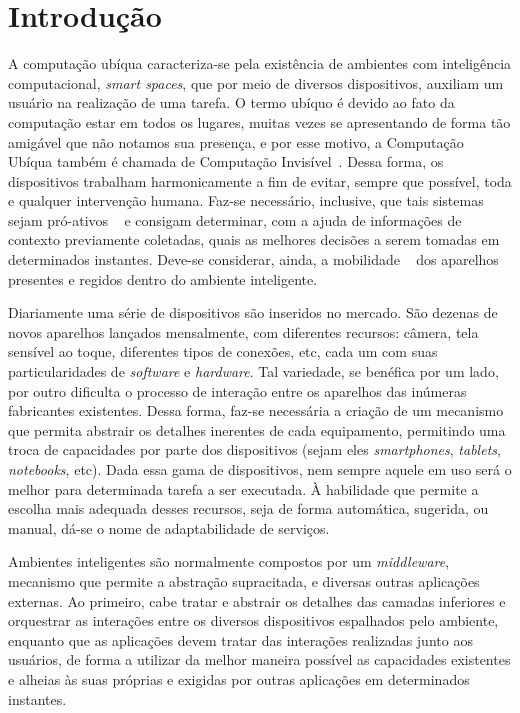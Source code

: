 \chapter{Introdução}

A computação ubíqua caracteriza-se pela existência de ambientes com inteligência computacional, \emph{smart spaces}, que por meio de diversos dispositivos, auxiliam um usuário na realização de uma tarefa. O termo ubíquo é devido ao fato da computação estar em todos os lugares, muitas vezes se apresentando de forma tão amigável que não notamos sua presença, e por esse motivo, a Computação Ubíqua também é chamada de Computação Invisível~\cite{gomes2007, weiser1993, weiser1999}. Dessa forma, os dispositivos trabalham harmonicamente a fim de evitar, sempre que possível, toda e qualquer intervenção humana. Faz-se necessário, inclusive, que tais sistemas sejam pró-ativos ~\cite{gomes2007, buzeto2010} e consigam determinar, com a ajuda de informações de contexto previamente coletadas, quais as melhores decisões a serem tomadas em determinados instantes. Deve-se considerar, ainda, a mobilidade ~\cite{gomes2007, buzeto2010, weiser1999} dos aparelhos presentes e regidos dentro do ambiente inteligente.

Diariamente uma série de dispositivos são inseridos no mercado. São dezenas de novos aparelhos lançados mensalmente, com diferentes recursos: câmera, tela sensível ao toque, diferentes tipos de conexões, etc, cada um com suas particularidades de \emph{software} e \emph{hardware}. Tal variedade, se benéfica por um lado, por outro dificulta o processo de interação entre os aparelhos das inúmeras fabricantes existentes. Dessa forma, faz-se necessária a criação de um mecanismo que permita abstrair os detalhes inerentes de cada equipamento, permitindo uma troca de capacidades por parte dos dispositivos (sejam eles \emph{smartphones}, \emph{tablets}, \emph{notebooks}, etc). Dada essa gama de dispositivos, nem sempre aquele em uso será o melhor para determinada tarefa a ser executada. À habilidade que permite a escolha mais adequada desses recursos, seja de forma automática, sugerida, ou manual, dá-se o nome de adaptabilidade de serviços.

Ambientes inteligentes são normalmente compostos por um \emph{middleware}, mecanismo que permite a abstração supracitada, e diversas outras aplicações externas. Ao primeiro, cabe tratar e abstrair os detalhes das camadas inferiores e orquestrar as interações entre os diversos dispositivos espalhados pelo ambiente, enquanto que as aplicações devem tratar das interações realizadas junto aos usuários, de forma a utilizar da melhor maneira possível as capacidades existentes e alheias às suas próprias e exigidas por outras aplicações em determinados instantes.

